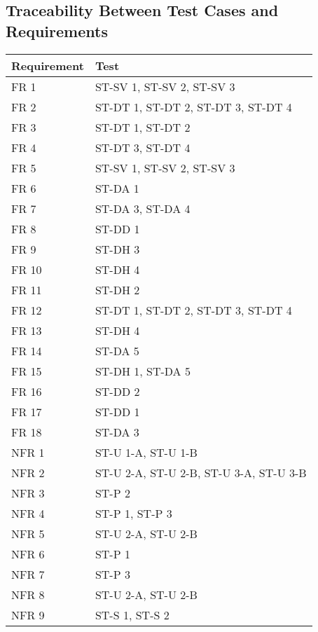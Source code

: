\documentclass[12pt, titlepage]{article}
\begin{document}
\subsection{Traceability Between Test Cases and Requirements}
\begin{tabular}{| p{} | p{}|}
  \hline
  \rowcolor[gray]{0.9}
  Requirement & Test \\
  \hline
  FR 1 & ST-SV 1, ST-SV 2, ST-SV 3 \\
  \hline
  FR 2 & ST-DT 1, ST-DT 2, ST-DT 3, ST-DT 4 \\
  \hline
  FR 3 & ST-DT 1, ST-DT 2 \\
  \hline
  FR 4 & ST-DT 3, ST-DT 4 \\
  \hline
  FR 5 & ST-SV 1, ST-SV 2, ST-SV 3 \\
  \hline
  FR 6 & ST-DA 1 \\
  \hline
  FR 7 & ST-DA 3, ST-DA 4 \\
  \hline
  FR 8 & ST-DD 1 \\
  \hline
  FR 9 & ST-DH 3 \\
  \hline
  FR 10 & ST-DH 4 \\
  \hline
  FR 11 & ST-DH 2 \\
  \hline
  FR 12 & ST-DT 1, ST-DT 2, ST-DT 3, ST-DT 4 \\
  \hline
  FR 13 & ST-DH 4 \\
  \hline
  FR 14 & ST-DA 5 \\
  \hline
  FR 15 & ST-DH 1, ST-DA 5\\
  \hline
  FR 16 & ST-DD 2 \\
  \hline
  FR 17 & ST-DD 1 \\
  \hline
  FR 18 & ST-DA 3 \\
  \hline
  NFR 1 & ST-U 1-A, ST-U 1-B \\
  \hline
  NFR 2 & ST-U 2-A, ST-U 2-B, ST-U 3-A, ST-U 3-B \\
  \hline
  NFR 3 & ST-P 2 \\
  \hline
  NFR 4 & ST-P 1, ST-P 3 \\
  \hline
  NFR 5 & ST-U 2-A, ST-U 2-B \\
  \hline
  NFR 6 & ST-P 1 \\
  \hline
  NFR 7 & ST-P 3 \\
  \hline
  NFR 8 & ST-U 2-A, ST-U 2-B \\
  \hline
  NFR 9 & ST-S 1, ST-S 2 \\
  \hline
\end{tabular}
\end{document}
